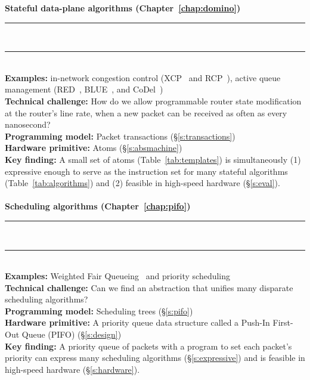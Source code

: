 \begin{table}
\textbf{Stateful data-plane algorithms (Chapter~\ref{chap:domino})}
\\[-7pt]\rule{\textwidth}{1pt}\\[-7pt]\rule{\textwidth}{1pt} \\
\textbf{Examples:} in-network congestion control (\eg XCP~\cite{xcp} and
RCP~\cite{rcp}), active queue management (\eg RED~\cite{red}, BLUE~\cite{blue},
and CoDel~\cite{codel}) \\
\textbf{Technical challenge:} How do we allow programmable router state
modification at the router's line rate, when a new packet can be received as
often as every nanosecond? \\
\textbf{Programming model:} Packet transactions (\S\ref{s:transactions})\\
\textbf{Hardware primitive:} Atoms (\S\ref{s:absmachine}) \\
\textbf{Key finding:} A small set of atoms (Table~\ref{tab:templates}) is
simultaneously (1) expressive enough to serve as the instruction set for many
stateful algorithms (Table~\ref{tab:algorithms}) and (2) feasible
in high-speed hardware (\S\ref{s:eval}). \\ \\

\textbf{Scheduling algorithms (Chapter~\ref{chap:pifo})}
\\[-7pt]\rule{\textwidth}{1pt}\\[-7pt]\rule{\textwidth}{1pt} \\
\textbf{Examples:} Weighted Fair Queueing~\cite{wfq} and priority scheduling~\cite{srpt} \\
\textbf{Technical challenge:} Can we find an abstraction that unifies many disparate
scheduling algorithms? \\
\textbf{Programming model:} Scheduling trees (\S\ref{s:pifo}) \\
\textbf{Hardware primitive:} A priority queue data structure called a Push-In First-Out
Queue (PIFO) (\S\ref{s:design}) \\
\textbf{Key finding:} A priority queue of packets with a program to set each
packet's priority can express many scheduling algorithms
(\S\ref{s:expressive}) and is feasible in high-speed hardware
(\S\ref{s:hardware}). \\\\


\end{table}
